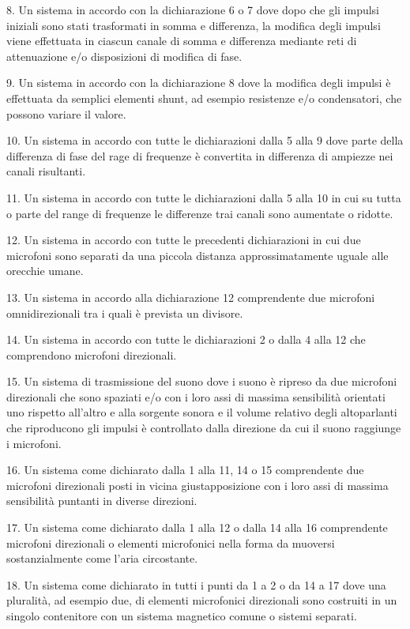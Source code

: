 \documentclass[11pt]{article}
\begin{document}
\begin{multicols*}{2}
8.  Un sistema in accordo con la dichiarazione 6 o 7 dove dopo che gli impulsi iniziali sono stati trasformati in somma e differenza, la modifica degli impulsi viene effettuata in ciascun canale di somma e differenza mediante reti di attenuazione e/o disposizioni di modifica di fase.

9. Un sistema in accordo con la dichiarazione 8 dove la modifica degli impulsi è effettuata da semplici elementi shunt, ad esempio resistenze e/o condensatori, che possono variare il valore. 

10.  Un sistema in accordo con tutte le dichiarazioni dalla 5 alla 9 dove parte della differenza di fase del rage di frequenze è convertita in differenza di ampiezze nei canali risultanti.

11. Un sistema in accordo con tutte le dichiarazioni dalla 5 alla 10 in cui su tutta o parte del range di frequenze le differenze trai canali sono aumentate o ridotte.

12. Un sistema in accordo con tutte le precedenti dichiarazioni in cui due microfoni sono separati da una piccola distanza approssimatamente uguale alle orecchie umane.

13. Un sistema in accordo alla dichiarazione 12 comprendente due microfoni omnidirezionali tra i quali è prevista un divisore.

14. Un sistema in accordo con tutte le dichiarazioni 2 o dalla 4 alla 12 che comprendono microfoni direzionali.

15. Un sistema di trasmissione del suono dove i suono è ripreso da due microfoni direzionali che sono spaziati e/o con i loro assi di massima sensibilità orientati uno rispetto all’altro e alla sorgente sonora e il volume relativo degli altoparlanti che riproducono gli impulsi è controllato dalla direzione da cui il suono raggiunge i microfoni.

16. Un sistema come dichiarato dalla 1 alla 11, 14 o 15 comprendente due microfoni direzionali posti in vicina giustapposizione con i loro assi di massima sensibilità puntanti in diverse direzioni.

17. Un sistema come dichiarato dalla 1 alla 12 o dalla 14 alla 16 comprendente microfoni direzionali o elementi microfonici nella forma da muoversi sostanzialmente come l’aria circostante.

18. Un sistema come dichiarato in tutti i punti da 1 a 2 o da 14 a 17 dove una pluralità, ad esempio due, di elementi microfonici direzionali sono costruiti in un singolo contenitore con un sistema magnetico comune o sistemi separati.
 

\end{multicols*}
\end{document}
